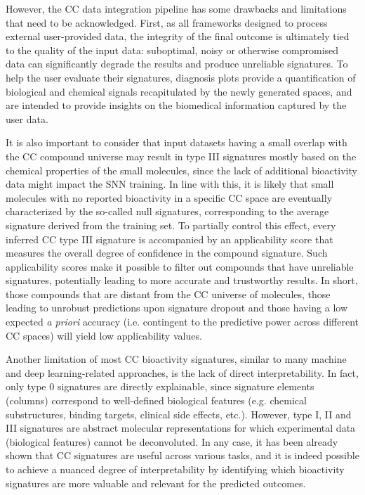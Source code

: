 However, the CC data integration pipeline has some drawbacks and limitations that need to be acknowledged. First, as all frameworks designed to process external user-provided data, the integrity of the final outcome is ultimately tied to the quality of the input data: suboptimal, noisy or otherwise compromised data can significantly degrade the results and produce unreliable signatures. To help the user evaluate their signatures, diagnosis plots provide a quantification of biological and chemical signals recapitulated by the newly generated spaces, and are intended to provide insights on the biomedical information captured by the user data.

It is also important to consider that input datasets having a small overlap with the CC compound universe may result in type III signatures mostly based on the chemical properties of the small molecules, since the lack of additional bioactivity data might impact the SNN training. In line with this, it is likely that small molecules with no reported bioactivity in a specific CC space are eventually characterized by the so-called null signatures, corresponding to the average signature derived from the training set. To partially control this effect, every inferred CC type III signature is accompanied by an applicability score that measures the overall degree of confidence in the compound signature. Such applicability scores make it possible to filter out compounds that have unreliable signatures, potentially leading to more accurate and trustworthy results. In short, those compounds that are distant from the CC universe of molecules, those leading to unrobust predictions upon signature dropout and those having a low expected \textit{a priori} accuracy (i.e. contingent to the predictive power across different CC spaces) will yield low applicability values.

Another limitation of most CC bioactivity signatures, similar to many machine and deep learning-related approaches\cite{jimenez-luna_artificial_2021, vamathevan_applications_2019}, is the lack of direct interpretability. In fact, only type 0 signatures are directly explainable, since signature elements (columns) correspond to well-defined biological features (e.g. chemical substructures, binding targets, clinical side effects, etc.). However, type I, II and III signatures are abstract molecular representations for which experimental data (biological features) cannot be deconvoluted. In any case, it has been already shown that CC signatures are useful across various tasks, and it is indeed possible to achieve a nuanced degree of interpretability by identifying which bioactivity signatures are more valuable and relevant for the predicted outcomes\cite{bertoni_bioactivity_2021}. 

